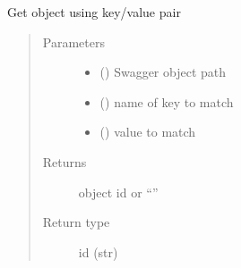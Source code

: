 \documentclass[letterpaper,10pt,english]{sphinxmanual}
\begin{document}
\begin{fulllineitems}
\begin{fulllineitems}
\label{\detokenize{b1tddfp-class:bloxone.b1tddfp.get_object_by_key}}
\sphinxAtStartPar
Get object using key/value pair
\begin{quote}\begin{description}
\item[{Parameters}] \leavevmode\begin{itemize}
\item {} 
\sphinxAtStartPar
{} () \textendash{} Swagger object path

\item {} 
\sphinxAtStartPar
{} () \textendash{} name of key to match

\item {} 
\sphinxAtStartPar
{} () \textendash{} value to match

\end{itemize}

\item[{Returns}] \leavevmode
\sphinxAtStartPar
object id or “”

\item[{Return type}] \leavevmode
\sphinxAtStartPar
id (str)

\end{description}\end{quote}

\end{fulllineitems}



\end{fulllineitems}
\end{document}
